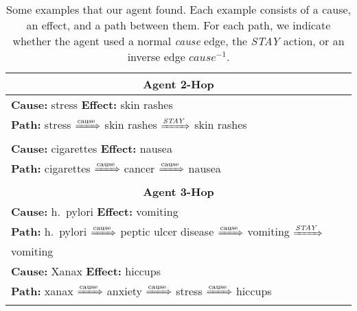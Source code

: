 \begin{table}
\centering
\caption{Some examples that our agent found. Each example consists of a cause, an effect, and a path between them. For each path, we indicate whether the agent used a normal \textit{cause} edge, the \textit{STAY} action, or an inverse edge \textit{$cause^{-1}$}.}
\label{table-examples}
\begin{tabular}{m{13cm} m{0.2cm}}
  \toprule
  \multicolumn{2}{c}{\textbf{Agent 2-Hop}} \\
  \midrule
   \vspace{0.2cm}
  \textbf{Cause:} stress \hspace{1cm} \textbf{Effect:} skin rashes &\\ 
   \vspace{0.2cm}
  \textbf{Path:} stress $\xRightarrow{\text{cause}}$ skin rashes $\xRightarrow{\text{\textit{STAY}}}$ skin rashes\vspace{0.2cm}\\
  \midrule
   \vspace{0.2cm}
  \textbf{Cause:} cigarettes \hspace{0.32cm} \textbf{Effect:} nausea &\\ 
   \vspace{0.2cm}
  \textbf{Path:} cigarettes $\xRightarrow{\text{cause}}$ cancer $\xRightarrow{\text{cause}}$ nausea\vspace{0.2cm}\\
  \bottomrule
  \toprule
  \multicolumn{2}{c}{\textbf{Agent 3-Hop}} \\
  \midrule
   \vspace{0.2cm}
  \textbf{Cause:} h.\ pylori \hspace{0.54cm} \textbf{Effect:} vomiting &\\ 
   \vspace{0.2cm}
  \textbf{Path:} h.\ pylori $\xRightarrow{\text{cause}}$ peptic ulcer disease $\xRightarrow{\text{cause}}$ vomiting $\xRightarrow{\text{\textit{STAY}}}$ vomiting \vspace{0.2cm}\\
  \midrule
   \vspace{0.2cm}
  \textbf{Cause:} Xanax \hspace{0.92cm} \textbf{Effect:} hiccups &\\ 
   \vspace{0.2cm}
  \textbf{Path:} xanax $\xRightarrow{\text{cause}}$ anxiety $\xRightarrow{\text{cause}}$ stress $\xRightarrow{\text{cause}}$ hiccups \vspace{0.2cm}\\

\end{tabular}
\end{table}
